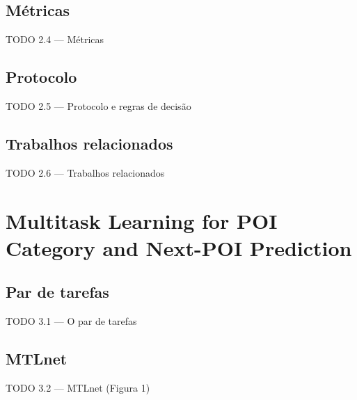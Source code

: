 \documentclass{beamer}
\begin{document}
\subsection{Métricas}
\begin{frame}{TODO 2.4 --- Métricas}
\end{frame}

\subsection{Protocolo}
\begin{frame}{TODO 2.5 --- Protocolo e regras de decisão}
\end{frame}

\subsection{Trabalhos relacionados}
\begin{frame}{TODO 2.6 --- Trabalhos relacionados}
\end{frame}

\section[MTLnet]{Multitask Learning for POI Category and Next-POI Prediction}      %

\subsection{Par de tarefas}
\begin{frame}{TODO 3.1 --- O par de tarefas}
\end{frame}

\subsection{MTLnet}
\begin{frame}{TODO 3.2 --- MTLnet (Figura 1)}
\end{frame}
\end{document}
